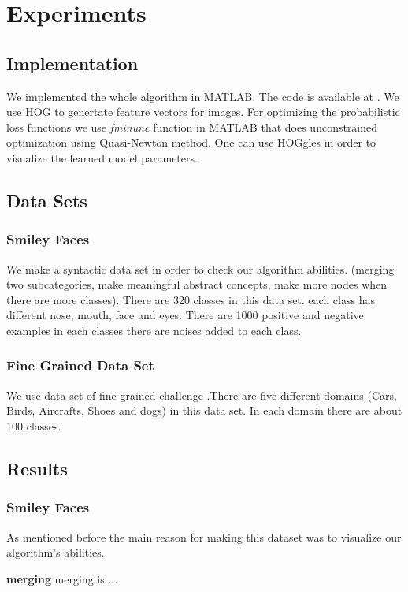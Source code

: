 \documentclass[10pt,twocolumn,letterpaper]{article}
\begin{document}
\section {Experiments}
 
 \subsection {Implementation}
 We implemented the whole algorithm in MATLAB.  The code is available at \cite{website:sourceCode}. We use HOG \cite{hog} to genertate feature vectors for images. 
 For optimizing the probabilistic loss functions we use \textit{fminunc} function in MATLAB that does unconstrained optimization using Quasi-Newton method. 
 One can use HOGgles \cite{hoggles} in order to visualize the learned model parameters.
 
 \subsection{Data Sets}
 \subsubsection{Smiley Faces}
 We make a syntactic data set in order to check our algorithm abilities. (merging two subcategories, make meaningful abstract concepts, make more nodes when there are more classes). There are 320 classes in this data set. each class has different nose, mouth, face and eyes. There are 1000 positive and negative examples in each classes there are noises added to each class. 
 \subsubsection{Fine Grained Data Set}
 We use data set of fine grained challenge \cite{dataset}.There are five different domains (Cars, Birds, Aircrafts, Shoes and dogs) in this data set. In each domain there are about 100 classes. 
 \subsection{Results}
 \subsubsection{Smiley Faces}
 As mentioned before the main reason for making this dataset was to visualize our algorithm's abilities.
 
 
\textbf{merging} merging is ...
 
\end{document}
